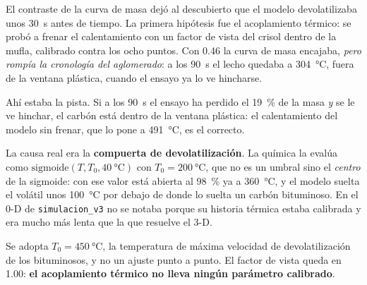 El contraste de la curva de masa dejó al descubierto que el modelo
devolatilizaba unos \SI{30}{\second} antes de tiempo. La primera hipótesis fue el
acoplamiento térmico: se probó a frenar el calentamiento con un factor de vista
del crisol dentro de la mufla, calibrado contra los ocho puntos. Con \num{0.46}
la curva de masa encajaba, \emph{pero rompía la cronología del aglomerado}: a los
\SI{90}{\second} el lecho quedaba a \SI{304}{\celsius}, fuera de la ventana
plástica, cuando el ensayo ya lo ve hincharse.

Ahí estaba la pista. Si a los \SI{90}{\second} el ensayo ha perdido el
\qty{19}{\percent} de la masa \emph{y} se le ve hinchar, el carbón está dentro de
la ventana plástica: el calentamiento del modelo sin frenar, que lo pone a
\SI{491}{\celsius}, es el correcto.

La causa real era la \textbf{compuerta de devolatilización}. La química la evalúa
como $\mathrm{sigmoide}(T, T_0, \SI{40}{\celsius})$ con
$T_0 = \SI{200}{\celsius}$, que no es un umbral sino el \emph{centro} de la
sigmoide: con ese valor está abierta al \qty{98}{\percent} ya a
\SI{360}{\celsius}, y el modelo suelta el volátil unos \SI{100}{\celsius} por
debajo de donde lo suelta un carbón bituminoso. En el 0-D de
\texttt{simulacion\_v3} no se notaba porque su historia térmica estaba calibrada
y era mucho más lenta que la que resuelve el 3-D.

Se adopta $T_0 = \SI{450}{\celsius}$, la temperatura de máxima velocidad de devolatilización de los bituminosos, y no un ajuste punto a punto. El factor de vista queda en \num{1.00}: \textbf{el acoplamiento térmico no lleva ningún parámetro calibrado}.
